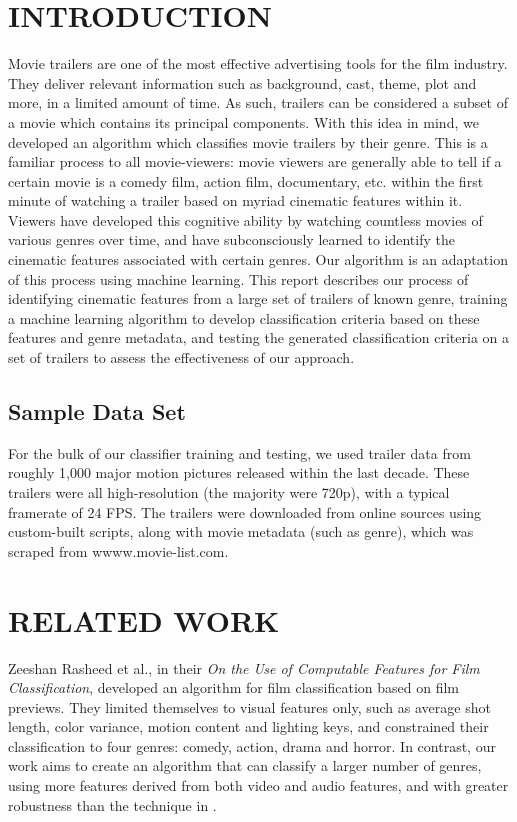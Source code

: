 \documentclass[letterpaper, 10 pt, conference]{ieeeconf}  %
\begin{document}
\section{INTRODUCTION}
Movie trailers are one of the most effective advertising tools for the film industry. They deliver relevant information such as background, cast, theme, plot and more, in a limited amount of time. As such, trailers can be considered a subset of a movie which contains its principal components. With this idea in mind, we developed an algorithm which classifies movie trailers by their genre. This is a familiar process to all movie-viewers: movie viewers are generally able to tell if a certain movie is a comedy film, action film, documentary, etc. within the first minute of watching a trailer based on myriad cinematic features within it. Viewers have developed this cognitive ability by watching countless movies of various genres over time, and have subconsciously learned to identify the cinematic features associated with certain genres. Our algorithm is an adaptation of this process using machine learning. This report describes our process of identifying cinematic features from a large set of trailers of known genre, training a machine learning algorithm to develop classification criteria based on these features and genre metadata, and testing the generated classification criteria on a set of trailers to assess the effectiveness of our approach.

\subsection{Sample Data Set}

For the bulk of our classifier training and testing, we used trailer data from roughly 1,000 major motion pictures released within the last decade. These trailers were all high-resolution (the majority were 720p), with a typical framerate of 24 FPS. The trailers were downloaded from online sources using custom-built scripts, along with movie metadata (such as genre), which was scraped from wwww.movie-list.com.

\section{RELATED WORK}
Zeeshan Rasheed et al., in their \textit{On the Use of Computable Features for Film Classification}\cite{Rasheed}, developed an algorithm for film classification based on film previews. They limited themselves to visual features only, such as average shot length, color variance, motion content and lighting keys, and constrained their classification to four genres: comedy, action, drama and horror. In contrast, our work aims to create an algorithm that can classify a larger number of genres, using more features derived from both video and audio features, and with greater robustness than the technique in \cite{Rasheed}.
\end{document}
